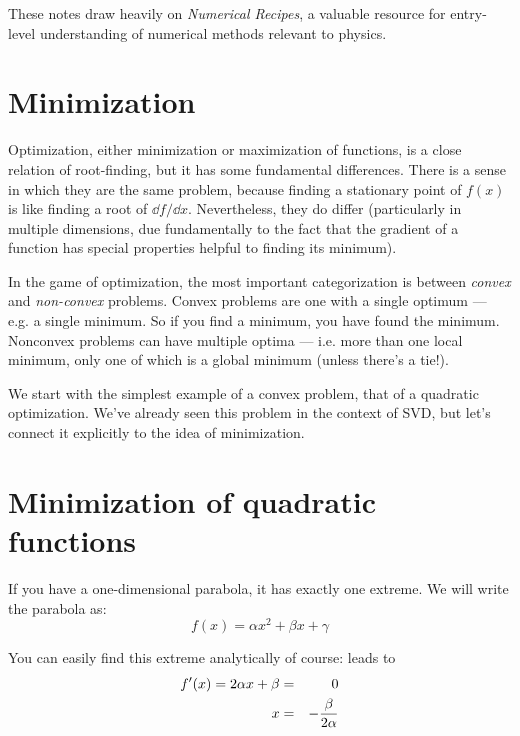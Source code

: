 These notes draw heavily on {\it Numerical Recipes}, a valuable
resource for entry-level understanding of numerical methods relevant
to physics.

\section{Minimization}

Optimization, either minimization or maximization of functions, is a
close relation of root-finding, but it has some fundamental
differences. There is a sense in which they are the same problem,
because finding a stationary point of $f(x)$ is like finding a root of
$\dd{f}/\dd{x}$. Nevertheless, they do differ (particularly in
multiple dimensions, due fundamentally to the fact that the gradient
of a function has special properties helpful to finding its minimum).

In the game of optimization, the most important categorization is
between {\it convex} and {\it non-convex} problems. Convex problems
are one with a single optimum --- e.g. a single minimum. So if you
find a minimum, you have found the minimum. Nonconvex problems can
have multiple optima --- i.e. more than one local minimum, only one of
which is a global minimum (unless there's a tie!).

We start with the simplest example of a convex problem, that of a
quadratic optimization. We've already seen this problem in the context
of SVD, but let's connect it explicitly to the idea of minimization.

\section{Minimization of quadratic functions}

If you have a one-dimensional parabola, it has exactly one
extreme. We will write the parabola as:
\begin{equation}
f(x) = \alpha x^2 + \beta x + \gamma
\end{equation}


\begin{answer}
You can easily find this extreme analytically of course:
leads to
\begin{eqnarray}
f'(x) =  2 \alpha x + \beta  &=& 0 \cr
x  &=& - \frac{\beta}{2\alpha} \cr
\end{eqnarray}
\end{answer}

